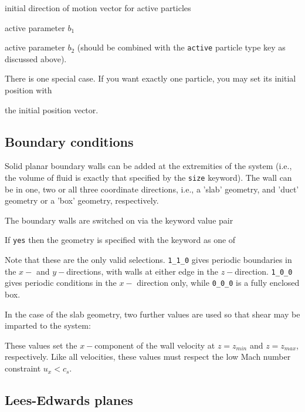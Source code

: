  initial direction of motion vector for active
particles

 active parameter $b_1$

 active parameter $b_2$ (should be combined
with the \texttt{active} particle type key as discussed above).

There is one special case. If you want exactly one particle, you may
set its initial position with

 the initial position vector.

\subsection{Boundary conditions}

Solid planar boundary walls can be added at the extremities of the
system (i.e., the volume of fluid is exactly that specified by
the \texttt{size} keyword). The wall can be in one, two or all three
coordinate directions, i.e., a 'slab' geometry, and 'duct' geometry
or a 'box' geometry, respectively.

The boundary walls are switched on via the keyword value pair


If \texttt{yes} then the geometry is specified with the keyword
as one of


Note that these are the only valid selections. \texttt{1\_1\_0}
gives periodic boundaries in the $x-$ and $y-$directions, with
walls at either edge in the $z-$direction. \texttt{1\_0\_0}
gives periodic conditions in the $x-$ direction only, while
\texttt{0\_0\_0} is a fully enclosed box.

In the case of the slab geometry, two further values are used so
that shear may be imparted to the system:



These values set the $x-$component of the wall velocity at
$z = z_{min}$ and $z = z_{max}$, respectively. Like all
velocities, these values must respect the low Mach number
constraint $u_x < c_s$.

\subsection{Lees-Edwards planes}

